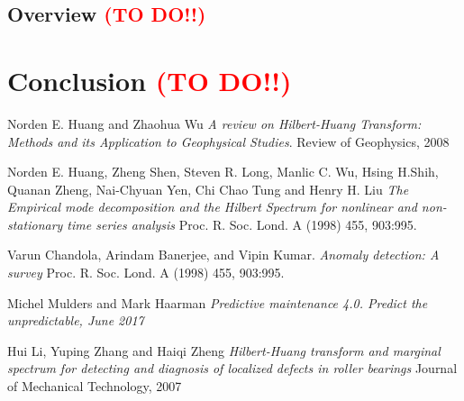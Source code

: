 \documentclass[11pt, oneside]{article}   	%
\begin{document}
\subsection{Overview   \textcolor{red}{(TO DO!!)}}


\section{Conclusion   \textcolor{red}{(TO DO!!)}}
\begin{thebibliography}{9}
Norden E. Huang and Zhaohua Wu 
\textit{A review on Hilbert-Huang Transform: Methods and its Application to Geophysical Studies}. 
Review of Geophysics, 2008
 
Norden E. Huang, Zheng Shen, Steven R. Long, Manlic C. Wu, Hsing H.Shih, Quanan Zheng, Nai-Chyuan Yen, Chi Chao Tung and Henry H. Liu
\textit{The Empirical mode decomposition and the Hilbert Spectrum for nonlinear and non-stationary time series analysis}
Proc. R. Soc. Lond. A (1998) 455, 903:995.

Varun Chandola, Arindam Banerjee, and Vipin Kumar.
\textit{Anomaly detection: A survey}
Proc. R. Soc. Lond. A (1998) 455, 903:995.


 
Michel Mulders and Mark Haarman
\textit{Predictive maintenance 4.0. Predict the unpredictable, June 2017}

 
Hui Li, Yuping Zhang and Haiqi Zheng
\textit{Hilbert-Huang transform and marginal spectrum for detecting and diagnosis of localized defects in roller bearings}
Journal of Mechanical Technology, 2007
\end{thebibliography}
\end{document}
